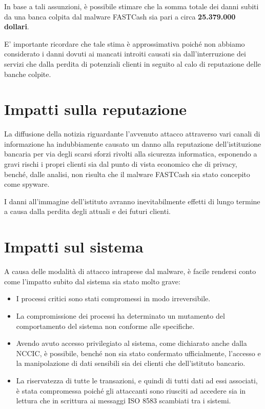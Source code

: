 \documentclass[10pt,a4paper, titlepage]{report}
\begin{document}
In base a tali assunzioni, è possibile stimare che la somma totale dei danni subiti da una banca colpita dal malware FASTCash sia pari a circa \textbf{25.379.000 dollari}.

E' importante ricordare che tale stima è approssimativa poiché non abbiamo considerato i danni dovuti ai mancati introiti causati sia dall'interruzione dei servizi che dalla perdita di potenziali clienti in seguito al calo di reputazione delle banche colpite.

\section{Impatti sulla reputazione}

La diffusione della notizia riguardante l'avvenuto attacco attraverso vari canali di informazione ha indubbiamente causato un danno alla reputazione dell'istituzione bancaria per via degli scarsi sforzi rivolti alla sicurezza informatica, esponendo a gravi rischi i propri clienti sia dal punto di vista economico che di privacy, benché, dalle analisi, non risulta che il malware FASTCash sia stato concepito come spyware.

I danni all'immagine dell'istituto avranno inevitabilmente effetti di lungo termine a causa dalla perdita degli attuali e dei futuri clienti.

\section{Impatti sul sistema}

A causa delle modalità di attacco intraprese dal malware, è facile rendersi conto come l'impatto subito dal sistema sia stato molto grave:
\begin{itemize}
\item I processi critici sono stati compromessi in modo irreversibile.
\item La compromissione dei processi ha determinato un mutamento del comportamento del sistema non conforme alle specifiche.
\item Avendo avuto accesso privilegiato al sistema, come dichiarato anche dalla NCCIC, è possibile, benché non sia stato confermato ufficialmente, l'accesso e la manipolazione di dati sensibili sia dei clienti che dell'istituto bancario.
\item La riservatezza di tutte le transazioni, e quindi di tutti dati ad essi associati, è stata compromessa poiché gli attaccanti sono riusciti ad accedere sia in lettura che in scrittura ai messaggi ISO 8583 scambiati tra i sistemi.
\end{itemize}
\end{document}
